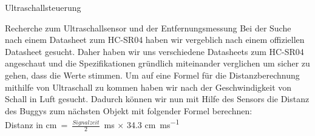 \documentclass[12pt]{report}
\begin{document}
\begin{section}{Ultraschallsteuerung}
    \begin{subsection}{Recherche zum Ultraschallsensor und der Entfernungsmessung}
        Bei der Suche nach einem Datasheet zum HC-SR04 haben wir vergeblich nach
        einem offiziellen Datasheet gesucht. Daher haben wir uns  verschiedene 
        Datasheets \cite{datasheetUltrasonic1,datasheetUltrasonic2,
          datasheetUltrasonic3} zum HC-SR04 angeschaut und die Spezifikationen gründlich
        miteinander verglichen um sicher zu gehen, dass die Werte stimmen.
        Um auf eine Formel für die Distanzberechnung mithilfe von Ultraschall
        zu kommen haben wir nach der Geschwindigkeit von Schall in Luft gesucht.
        Dadurch können wir nun mit Hilfe des Sensors die Distanz des Buggys zum
        nächsten Objekt mit folgender Formel berechnen:\\
        Distanz in \si\cm = \( \frac{Signalzeit}{2} \) \si{\milli\second} $ \times $ 34.3 \si[per-mode = fraction]{\cm\per\milli\second}
    \end{subsection}


\end{section}
\end{document}
